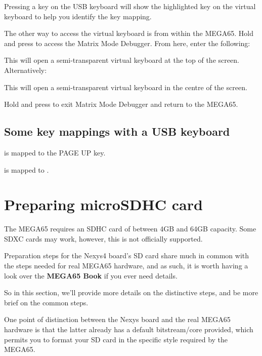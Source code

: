Pressing a key on the USB keyboard will show the highlighted key on the virtual keyboard to help you identify the key mapping.

The other way to access the virtual keyboard is from within the MEGA65. Hold \megasymbolkey and press  to access the Matrix Mode Debugger. From here, enter the following:


This will open a semi-transparent virtual keyboard at the top of the screen. Alternatively:


This will open a semi-transparent virtual keyboard in the centre of the screen.

Hold \megasymbolkey and press  to exit Matrix Mode Debugger and return to the MEGA65.

\subsection{Some key mappings with a USB keyboard}

 is mapped to the PAGE UP key.

 is mapped to .

\newpage

\section{Preparing microSDHC card}

The MEGA65 requires an SDHC card of between 4GB and 64GB capacity.  Some SDXC cards may work, however, this is not officially supported.

Preparation steps for the Nexys4 board's SD card share much in common with the
steps needed for real MEGA65 hardware, and as such, it is worth having a look
over
\ifdefined\printmanual
the {\bf MEGA65 Book}
\else
{}
\fi
if you ever need details.

So in this section, we'll provide more details on the distinctive steps, and be more brief on the common steps.

One point of distinction between the Nexys board and the real MEGA65 hardware is that the latter already has a default bitstream/core provided, which permits you to format your SD card in the specific style required by the MEGA65.

